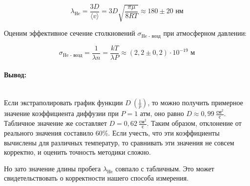 \documentclass[a4paper, 12pt]{article}
\newcommand{\parag}[1]{\paragraph*{#1:}}
\begin{document}
\[
    \lambda_{\text{He}} = \frac{3D}{\langle v \rangle} = 3D \sqrt{\frac{\pi \mu}{8RT}} \approx 180 \pm 20 \text{ нм}
\]

Оценим эффективное сечение столкновений $\sigma_{\text{He - возд}}$ при атмосферном давлении:

\[
    \sigma_{\text{He - возд}} = \frac{1}{\lambda n} = \frac{kT}{\lambda P} \approx (2,2 \pm 0,2) \cdot 10^{-19} \text{ м}
\]

\parag{Вывод} ~\\

Если экстраполировать график функции $\displaystyle D ~(\frac{1}{p})$, то можно получить примерное значение коэффициента диффузии при $P = 1$ атм, оно равно $D \approx 0,99 ~ \frac{\text{см}^2}{\text{с}}$. Табличное значение же составляет $D = 0,62 ~ \frac{\text{см}^2}{\text{с}}$. Таким образом, отклонение от реального значения составило 60\%. Если учесть, что эти коэффициенты вычислены для различных температур, то сравнивать эти значения не совсем корректно, и оценить точность методики сложно.

Но зато значение длины пробега $\lambda_{\text{He}}$ совпало с табличным. Это может свидетельствовать о корректности нашего способа измерения.
\end{document}
